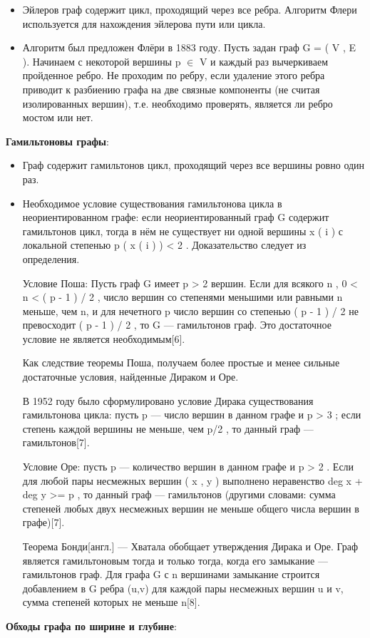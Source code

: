 \documentclass[
]{article}
\providecommand{\tightlist}{%
  \setlength{\itemsep}{0pt}\setlength{\parskip}{0pt}}
\begin{document}
\begin{enumerate}
{{{{{  \begin{itemize}
  \tightlist
  \item
    Эйлеров граф содержит цикл, проходящий через все ребра. Алгоритм
    Флери используется для нахождения эйлерова пути или цикла.

  \item 
Алгоритм был предложен Флёри в 1883 году.
Пусть задан граф G = ( V , E ). Начинаем с некоторой вершины p $\in$ V  и каждый раз вычеркиваем пройденное ребро. Не проходим по ребру, если удаление этого ребра приводит к разбиению графа на две связные компоненты (не считая изолированных вершин), т.е. необходимо проверять, является ли ребро мостом или нет. 
  \end{itemize}
\item
  \textbf{Гамильтоновы графы}:

  \begin{itemize}
  \tightlist
  \item
    Граф содержит гамильтонов цикл, проходящий через все вершины ровно
    один раз.
  \item 
Необходимое условие существования гамильтонова цикла в неориентированном графе: если неориентированный граф G содержит гамильтонов цикл, тогда в нём не существует ни одной вершины x ( i )  с локальной степенью p ( x ( i ) ) < 2 . Доказательство следует из определения.

Условие Поша: Пусть граф G имеет p > 2  вершин. Если для всякого n , 0 < n < ( p - 1 ) / 2 , число вершин со степенями меньшими или равными n меньше, чем n, и для нечетного p  число вершин со степенью ( p - 1 ) / 2  не превосходит ( p - 1 ) / 2 , то G — гамильтонов граф. Это достаточное условие не является необходимым[6].

Как следствие теоремы Поша, получаем более простые и менее сильные достаточные условия, найденные Дираком и Оре.

В 1952 году было сформулировано условие Дирака существования гамильтонова цикла: пусть p  — число вершин в данном графе и p > 3 ; если степень каждой вершины не меньше, чем p/2 , то данный граф — гамильтонов[7].

Условие Оре: пусть p  — количество вершин в данном графе и p > 2 . Если для любой пары несмежных вершин ( x , y )  выполнено неравенство deg x + deg y >= p , то данный граф — гамильтонов (другими словами: сумма степеней любых двух несмежных вершин не меньше общего числа вершин в графе)[7].

Теорема Бонди[англ.] — Хватала обобщает утверждения Дирака и Оре. Граф является гамильтоновым тогда и только тогда, когда его замыкание — гамильтонов граф. Для графа G с n вершинами замыкание строится добавлением в G ребра (u,v) для каждой пары несмежных вершин u и v, сумма степеней которых не меньше n[8]. 
  \end{itemize}
\item
  \textbf{Обходы графа по ширине и глубине}:

}}}}}
\end{enumerate}
\end{document}
